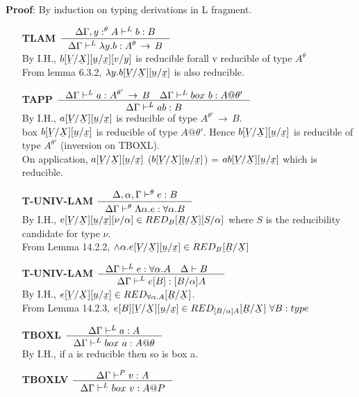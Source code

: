 \documentclass[12pt]{article}
\newcommand{\ub}[1]{\underaccent{\bar}{#1}}
\newcommand{\arr}{\ensuremath{\,\rightarrow\,}}
\begin{document}
\textbf{Proof}: By induction on typing derivations in L fragment.\\
\begin{itemize}
\item[\textbf{TLAM}]$\inference{\Delta\Gamma,y:^\theta A\vdash^Lb:B}{\Delta\Gamma\vdash^L\lambda y.b:A^\theta\arr B}$\\
By I.H., $b[\ub{V}/\ub{X}][\ub{u}/\ub{x}][v/y]$ is reducible forall v reducible of type $A^\theta$\\
From lemma 6.3.2, $\lambda y.b[\ub{V}/\ub{X}][\ub{u}/\ub{x}]$ is also reducible.
\item[\textbf{TAPP}]$\inference{\Delta\Gamma\vdash^La:A^{\theta'}\arr B \quad \Delta\Gamma\vdash^L box\ b:A@\theta'}{\Delta\Gamma\vdash^Lab:B}$\\
By I.H., $a[\ub{V}/\ub{X}][\ub{u}/\ub{x}]$ is reducible of type $A^{\theta'}\arr B$.\\
box $b[\ub{V}/\ub{X}][\ub{u}/\ub{x}]$ is reducible of type $A@\theta'$.
Hence $b[\ub{V}/\ub{X}][\ub{u}/\ub{x}]$ is reducible of type $A^{\theta'}$ (inversion on TBOXL).\\
On application, $a[\ub{V}/\ub{X}][\ub{u}/\ub{x}]$ ($b[\ub{V}/\ub{X}][\ub{u}/\ub{x}]$) = $ab[\ub{V}/\ub{X}][\ub{u}/\ub{x}]$ which is reducible.
\item[\textbf{T-UNIV-LAM}]$\inference{\Delta,\alpha,\Gamma \vdash^{\theta} e:B}{\Delta\Gamma
  \vdash^{\theta} \Lambda \alpha.e:\forall \alpha.B}$\\
By I.H., $e[\ub{V}/\ub{X}][\ub{u}/\ub{x}][\nu/\alpha] \in RED_B[\ub{R}/\ub{X}][S/\alpha]$ where $S$ is the reducibility candidate for type $\nu$.\\
From Lemma 14.2.2, $\wedge \alpha.e[\ub{V}/\ub{X}][\ub{u}/\ub{x}] \in RED_B[\ub{R}/\ub{X}]$
\item[\textbf{T-UNIV-LAM}]$ \inference{\Delta\Gamma \vdash^{L} e:\forall \alpha.A \quad \Delta \vdash
B \quad }{\Delta\Gamma \vdash^{L} e[B]:[B/\alpha]A}  $\\
By I.H., $e[\ub{V}/\ub{X}][\ub{u}/\ub{x}] \in RED_{\forall\alpha.A}[\ub{R}/\ub{X}]$.\\
From Lemma 14.2.3, $e[B][\ub{V}/\ub{X}][\ub{u}/\ub{x}] \in RED_{[B/\alpha]A}[\ub{R}/\ub{X}]\ \forall B:type$\\
\item[\textbf{TBOXL}]$\inference{\Delta\Gamma \vdash^L a:A}{\Delta\Gamma \vdash^L box\ a:A@\theta}$\\
By I.H., if a is reducible then so is box a.\\
\item[\textbf{TBOXLV}]$\inference{\Delta\Gamma \vdash^P v:A}{\Delta\Gamma \vdash^L box\ v:A@P}$\\

\end{itemize}
\end{document}
